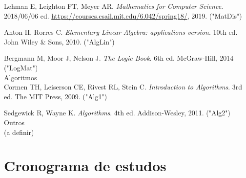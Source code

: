 \documentclass[a4paper]{inzane_syllabus} %
\begin{document}
Lehman E, Leighton FT, Meyer AR. \emph{Mathematics for Computer Science}. 2018/06/06
ed. \url{https://courses.csail.mit.edu/6.042/spring18/}, 2019. ("MatDis")

Anton H, Rorres C. \emph{Elementary Linear Algebra: applications version}. 10th
ed. John Wiley \& Sons, 2010. ("AlgLin")

Bergmann M, Moor J, Nelson J. \emph{The Logic Book}. 6th ed. McGraw-Hill, 2014
("LogMat")\\

{\color{myCOLOR} Algoritmos}\\
Cormen TH, Leiserson CE, Rivest RL, Stein C. \emph{Introduction to Algorithms}.
3rd ed. The MIT Press, 2009. ("Alg1")

Sedgewick R, Wayne K. \emph{Algorithms}. 4th ed. Addison-Wesley, 2011. ("Alg2")\\

{\color{myCOLOR} Outros}\\
(a definir)


\newpage
\makeFullPage
\section{Cronograma de estudos}
\end{document}

